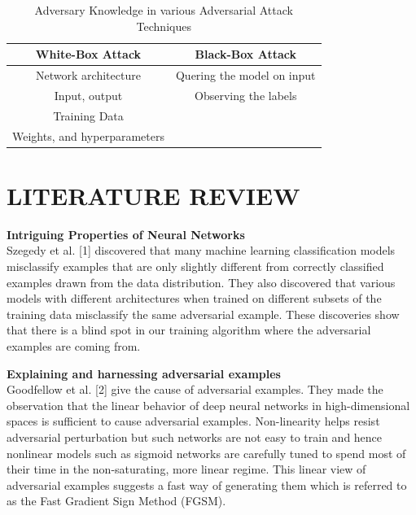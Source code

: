 \begin{table}[H]
\centering
\begin{tabular}{|c|c|}
\hline
\textbf{White-Box Attack} & \textbf{Black-Box Attack}\\
\hline
Network architecture & Quering the model on input \\
\hline 
Input, output & Observing the labels \\
\hline
Training Data &   \\
\hline
Weights, and hyperparameters &   \\
 \hline
\end{tabular}
\caption{Adversary Knowledge in various Adversarial Attack Techniques}
\label{tab:Table1}
\end{table}


\section{LITERATURE REVIEW}

\textbf{Intriguing Properties of Neural Networks}\\
Szegedy et al. [1] discovered that many machine learning classification models misclassify examples that are only slightly different from correctly classified examples drawn from the data distribution. They also discovered that various models with different architectures when trained on different subsets of the training data misclassify the same adversarial example. These discoveries show that there is a blind spot in our training algorithm where the adversarial examples are coming from.

\textbf{Explaining and harnessing adversarial examples}\\
Goodfellow et al. [2] give the cause of adversarial examples. They made the observation that the linear behavior of deep neural networks in high-dimensional spaces is sufficient to cause adversarial examples. Non-linearity helps resist adversarial perturbation but such networks are not easy to train and hence nonlinear models such as sigmoid networks are carefully tuned to spend most of their time in the non-saturating, more linear regime. This linear view of adversarial examples suggests a fast way of generating them which is referred to as the Fast Gradient Sign Method (FGSM).

